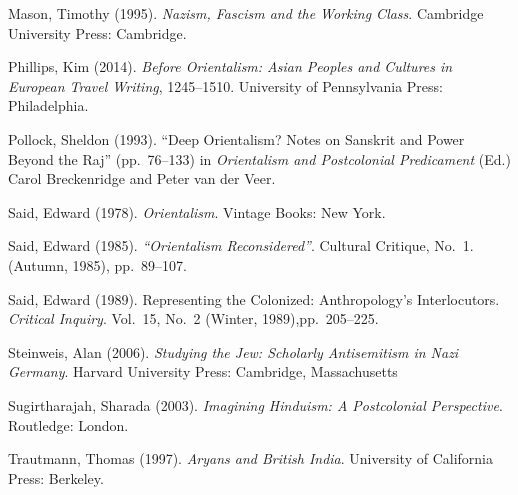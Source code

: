 \begin{thebibliography}{99}
Mason, Timothy (1995). {\sl Nazism, Fascism and the Working Class}. Cambridge University Press: Cambridge.

Phillips, Kim (2014). {\sl Before Orientalism: Asian Peoples and Cultures in European Travel Writing}, 1245--1510. University of Pennsylvania Press: Philadelphia.

Pollock, Sheldon (1993). “Deep Orientalism? Notes on Sanskrit and Power Beyond the Raj” (pp.~76--133) in {\sl Orientalism and Postcolonial Predicament} (Ed.) Carol Breckenridge and Peter van der Veer.

Said, Edward (1978). {\sl Orientalism}. Vintage Books: New York.

Said, Edward (1985). {\sl “Orientalism Reconsidered”}. Cultural Critique, No.~1. (Autumn, 1985), pp.~89--107.

Said, Edward (1989). Representing the Colonized: Anthropology's Interlocutors. {\sl Critical Inquiry}. Vol.~15, No.~2 (Winter, 1989),\break pp.~205--225.

Steinweis, Alan (2006). {\sl Studying the Jew: Scholarly Antisemitism in Nazi Germany}. Harvard University Press: Cambridge, Massachusetts 

Sugirtharajah, Sharada (2003). {\sl Imagining Hinduism: A Postcolonial Perspective}. Routledge: London.

Trautmann, Thomas (1997). {\sl Aryans and British India}. University of California Press: Berkeley.
\end{thebibliography}

\theendnotes
